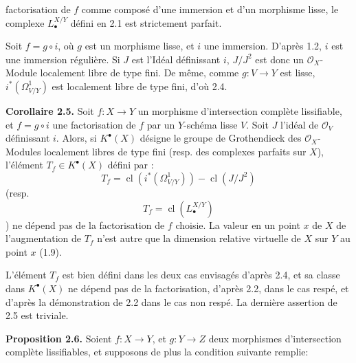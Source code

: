 factorisation de $f$ comme composé d'une immersion et d'un morphisme lisse, le complexe $L^{X/Y}_\bullet$ défini en 2.1 est strictement parfait.

Soit $f=g\circ i$, où $g$ est un morphisme lisse, et $i$ une immersion. D'après 1.2, $i$ est une immersion régulière. Si $J$ est l'Idéal définissant $i$, $J/J^2$ est donc un $\mathcal O_X$-Module localement libre de type fini. De même, comme $g:V\to Y$ est lisse, $i^*(\Omega^1_{V/Y})$ est localement libre de type fini, d'où 2.4.

\textbf{Corollaire 2.5.} Soit $f:X\to Y$ un morphisme d'intersection complète lissifiable, et $f=g\circ i$ une factorisation de $f$ par un $Y$-schéma lisse $V$. Soit $J$ l'idéal de $\mathcal O_V$ définissant $i$. Alors, si $K^{\bullet}(X)$ désigne le groupe de Grothendieck des $\mathcal O_X$-Modules localement libres de type fini (resp. des complexes parfaits sur $X$), l'élément $T_f\in K^{\bullet}(X)$ défini par :
\[
T_f=\operatorname{cl}(i^*(\Omega^1_{V/Y}))-\operatorname{cl}(J/J^2)
\]
(resp.
\[
T_f=\operatorname{cl}(L^{X/Y}_\bullet)
\]
)
ne dépend pas de la factorisation de $f$ choisie. La valeur en un point $x$ de $X$ de l'augmentation de $T_f$ n'est autre que la dimension relative virtuelle de $X$ sur $Y$ au point $x$ (1.9).

L'élément $T_f$ est bien défini dans les deux cas envisagés d'après 2.4, et sa classe dans $K^{\bullet}(X)$ ne dépend pas de la factorisation, d'après 2.2, dans le cas respé, et d'après la démonstration de 2.2 dans le cas non respé. La dernière assertion de 2.5 est triviale.

\textbf{Proposition 2.6.} Soient $f:X\to Y$, et $g:Y\to Z$ deux morphismes d'intersection complète lissifiables, et supposons de plus la condition suivante remplie:

